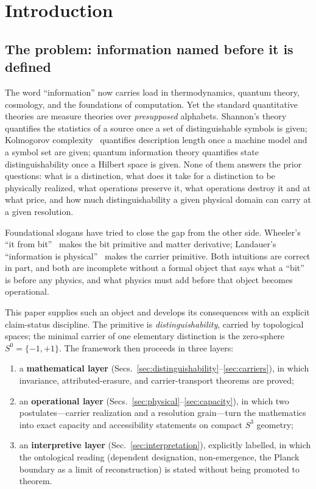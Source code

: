 \documentclass[11pt,a4paper]{article}
\theoremstyle{definition}
\theoremstyle{remark}
\newcommand{\Szero}{S^{0}}
\newcommand{\Sthree}{S^{3}}
\begin{document}
\tableofcontents

\section{Introduction}

\subsection{The problem: information named before it is defined}

The word ``information'' now carries load in thermodynamics, quantum theory, cosmology, and the
foundations of computation.  Yet the standard quantitative theories are measure theories over
\emph{presupposed} alphabets.  Shannon's theory~\cite{Shannon1948} quantifies the statistics of a
source once a set of distinguishable symbols is given; Kolmogorov
complexity~\cite{Kolmogorov1965} quantifies description length once a machine model and a symbol
set are given; quantum information theory quantifies state distinguishability once a Hilbert
space is given.  None of them answers the prior questions: what is a distinction, what does it
take for a distinction to be physically realized, what operations preserve it, what operations
destroy it and at what price, and how much distinguishability a given physical domain can carry
at a given resolution.

Foundational slogans have tried to close the gap from the other side.  Wheeler's ``it from
bit''~\cite{Wheeler1990} makes the bit primitive and matter derivative; Landauer's ``information
is physical''~\cite{Landauer1991} makes the carrier primitive.  Both intuitions are correct in
part, and both are incomplete without a formal object that says what a ``bit'' is before any
physics, and what physics must add before that object becomes operational.

This paper supplies such an object and develops its consequences with an explicit claim-status
discipline.  The primitive is \emph{distinguishability}, carried by topological spaces; the
minimal carrier of one elementary distinction is the zero-sphere $\Szero=\{-1,+1\}$.  The
framework then proceeds in three layers:

\begin{enumerate}[label=(\Roman*)]
\item a \textbf{mathematical layer} (Secs.~\ref{sec:distinguishability}--\ref{sec:carriers}),
in which invariance, attributed-erasure, and carrier-transport theorems are proved;
\item an \textbf{operational layer} (Secs.~\ref{sec:physical}--\ref{sec:capacity}), in which two
postulates---carrier realization and a resolution grain---turn the mathematics into exact
capacity and accessibility statements on compact $\Sthree$ geometry;
\item an \textbf{interpretive layer} (Sec.~\ref{sec:interpretation}), explicitly labelled, in
which the ontological reading (dependent designation, non-emergence, the Planck boundary as a
limit of reconstruction) is stated without being promoted to theorem.
\end{enumerate}
\end{document}
